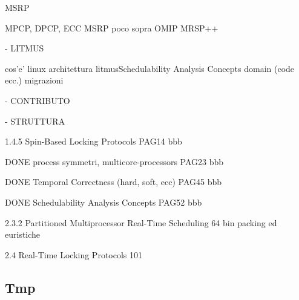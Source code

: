 MSRP




MPCP, DPCP, ECC
MSRP poco sopra
OMIP
MRSP++

- LITMUS

cos'e'
linux
architettura litmusSchedulability Analysis Concepts
domain (code ecc.)
migrazioni

- CONTRIBUTO

- STRUTTURA


1.4.5
Spin-Based Locking Protocols PAG14 bbb

DONE process symmetri, multicore-processors PAG23 bbb

DONE Temporal Correctness (hard, soft, ecc) PAG45 bbb

DONE Schedulability Analysis Concepts PAG52 bbb

2.3.2 Partitioned Multiprocessor Real-Time Scheduling 64
bin packing ed euristiche

2.4 Real-Time Locking Protocols 101

\subsection{Tmp}
\label{sec:introduzione_}